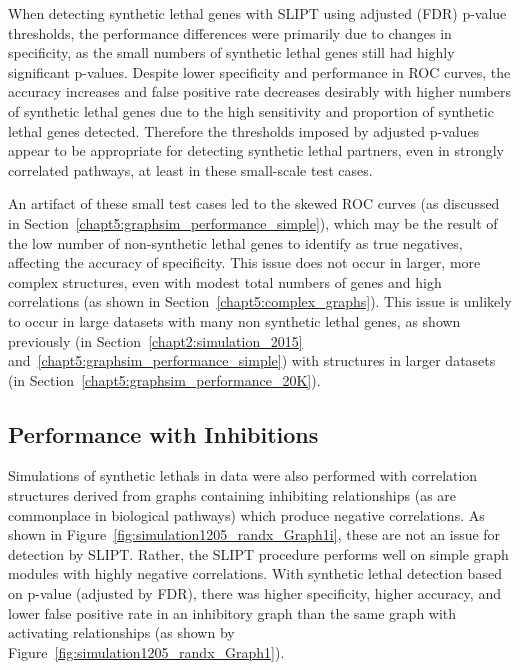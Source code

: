 When detecting \gls{synthetic lethal} genes with \gls{SLIPT} using adjusted (\gls{FDR}) p-value thresholds, the performance differences were primarily due to changes in specificity, as the small numbers of \gls{synthetic lethal} genes still had highly significant p-values. Despite lower specificity and performance in \gls{ROC} curves, the accuracy increases and false positive rate decreases desirably with higher numbers of \gls{synthetic lethal} genes due to the high sensitivity and proportion of \gls{synthetic lethal} genes detected. Therefore the thresholds imposed by adjusted p-values appear to be appropriate for detecting \gls{synthetic lethal} partners, even in strongly correlated pathways, at least in these small-scale test cases.

An artifact of these small test cases led to the skewed \gls{ROC} curves (as discussed in Section~\ref{chapt5:graphsim_performance_simple}), which may be the result of the low number of non-synthetic lethal genes to identify as true negatives, affecting the accuracy of specificity. This issue does not occur in larger, more complex  structures, even with modest total numbers of genes and high correlations (as shown in Section~\ref{chapt5:complex_graphs}). This issue is unlikely to occur in large  datasets with many non synthetic lethal genes, as shown previously (in Section~\ref{chapt2:simulation_2015} and~\ref{chapt5:graphsim_performance_simple}) with  structures in larger datasets (in Section~\ref{chapt5:graphsim_performance_20K}). 

\FloatBarrier


\subsection{Performance with Inhibitions}
\label{chapt5:graphsim_performance_inhib}

\FloatBarrier

Simulations of \glspl{synthetic lethal} in  data were also performed with correlation structures derived from \glspl{graph} containing inhibiting relationships (as are commonplace in biological pathways) which produce negative correlations. As shown in Figure~\ref{fig:simulation1205_randx_Graph1i}, these are not an issue for detection by \gls{SLIPT}. Rather, the \gls{SLIPT} procedure performs well on simple graph modules with highly negative correlations. With \gls{synthetic lethal} detection based on p-value (adjusted by \gls{FDR}), there was higher specificity, higher accuracy, and lower false positive rate in an inhibitory graph than the same graph with activating relationships (as shown by Figure~\ref{fig:simulation1205_randx_Graph1}).


